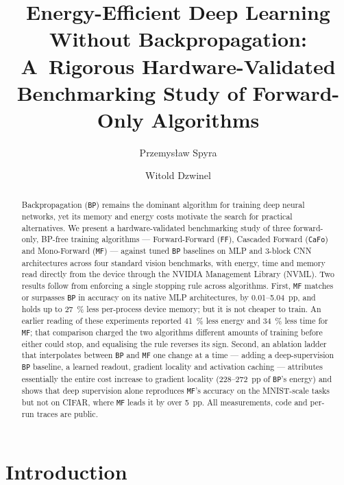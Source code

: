 \documentclass{llncs}
\title{Energy-Efficient Deep Learning Without Backpropagation:\\
A~Rigorous Hardware-Validated Benchmarking Study of Forward-Only
Algorithms}
\author{Przemys{\l}aw Spyra\inst{1}\orcidID{0009-0009-3001-2604} \and
Witold Dzwinel\inst{1}\orcidID{0000-0001-8321-5928}}
\institute{AGH University of Krakow, Faculty of Computer Science\\
\email{przspyra@agh.edu.pl, dzwinel@agh.edu.pl}}
\newcommand{\FF}{\texttt{FF}}
\newcommand{\MF}{\texttt{MF}}
\newcommand{\BP}{\texttt{BP}}
\newcommand{\CaFo}{\texttt{CaFo}}
\begin{document}
\maketitle

\begin{abstract}
Backpropagation (\BP{}) remains the dominant algorithm for training deep
neural networks, yet its memory and energy costs motivate the search for
practical alternatives. We present a hardware-validated benchmarking
study of three forward-only, BP-free training algorithms --- Forward-Forward
(\FF{}), Cascaded Forward (\CaFo{}) and Mono-Forward (\MF{}) --- against
tuned \BP{} baselines on MLP and 3-block CNN architectures across four
standard vision benchmarks, with energy, time and memory read directly from
the device through the NVIDIA Management Library (NVML). Two results follow
from enforcing a single stopping rule across algorithms. First, \MF{} matches
or surpasses \BP{} in accuracy on its native MLP architectures, by
\numrange{0.01}{5.04}~pp, and holds up to \SI{27}{\percent} less per-process
device memory; but it is not cheaper to train. An earlier reading of these
experiments reported \SI{41}{\percent} less energy and \SI{34}{\percent} less
time for \MF{}; that comparison charged the two algorithms different amounts
of training before either could stop, and equalising the rule reverses its
sign. Second, an ablation ladder that interpolates between \BP{} and \MF{}
one change at a time --- adding a deep-supervision \BP{} baseline, a learned
readout, gradient locality and activation caching --- attributes essentially
the entire cost increase to gradient locality (\numrange{228}{272}~pp of
\BP{}'s energy) and shows that deep supervision alone reproduces \MF{}'s
accuracy on the MNIST-scale tasks but not on CIFAR, where \MF{} leads it by
over \num{5}~pp. All measurements, code and per-run traces are public.
\end{abstract}


\section{Introduction}
\end{document}
